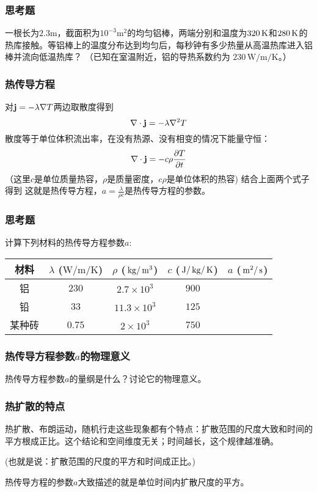 \documentclass[CJK]{beamer}
\begin{document}
\begin{frame}
  \frametitle{思考题}
  一根长为$2.3\mathrm{m}$，截面积为$10^{-3}\mathrm{m^2}$的均匀铝棒，两端分别和温度为$320\,\mathrm{K}$和$280\,\mathrm{K}$的热库接触。等铝棒上的温度分布达到均匀后，每秒钟有多少热量从高温热库进入铝棒并流向低温热库？
  （已知在室温附近，铝的导热系数约为 $230\,\mathrm{W/m/K}$。）

\end{frame}


\begin{frame}
  \frametitle{热传导方程}
  对${\mathbf{j}} = -\lambda\nabla T$两边取散度得到
  $$\nabla \cdot {\mathbf{j}} = -\lambda \nabla^2T$$
  散度等于单位体积流出率，在没有热源、没有相变的情况下能量守恒：
  $$\nabla\cdot {\mathbf{j}} = -c\rho \frac{\partial T}{\partial t}$$
  （这里$c$是单位质量热容，$\rho$是质量密度，$c\rho$是单位体积的热容)
    结合上面两个式子得到
    这就是{\blue 热传导方程，$a = \frac{\lambda}{\rho c}$是热传导方程的参数。}
\end{frame}


\begin{frame}
  \frametitle{思考题}
  计算下列材料的热传导方程参数$a$:

  \begin{tabular}{ccccc}
    \hline
    \hline
    材料 & $\lambda$ ($\mathrm{W/m/K}$) & $\rho$ ($\,\mathrm{kg}/\,\mathrm{m}^3$) & $c$ ($\,\mathrm{J}/\,\mathrm{kg}/\,\mathrm{K}$) & $a$ ($\,\mathrm{m}^2/\,\mathrm{s}$) \\
    \hline
    铝 & $230$ & $2.7\times 10^3$ & $900$ & \\
    铅 &  $33$ & $11.3\times 10^3$ & $125$ & \\
    某种砖 & $0.75$ & $2\times 10^3$ & $750$ & \\
    \hline
  \end{tabular}
\end{frame}


\begin{frame}
  \frametitle{热传导方程参数$a$的物理意义}

  
  热传导方程参数$a$的量纲是什么？讨论它的物理意义。
\end{frame}


\begin{frame}
  \frametitle{热扩散的特点}
  热扩散、布朗运动，随机行走这些现象都有个特点：{\blue 扩散范围的尺度大致和时间的平方根成正比}。这个结论和空间维度无关；时间越长，这个规律越准确。

  \skipline

  (也就是说：扩散范围的尺度的平方和时间成正比。)

  \skipline

  {\blue 热传导方程的参数$a$大致描述的就是单位时间内扩散尺度的平方。}

  
 
\end{frame}
\end{document}
